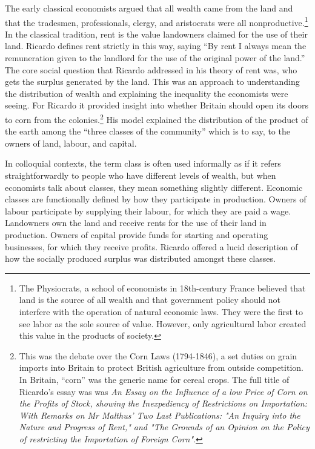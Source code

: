  The early classical economists argued that all wealth came from the land and that  the tradesmen, professionals, clergy, and aristocrats were all nonproductive.\footnote{The Physiocrats, a school of economists in 18th-century France believed that land is the source of all wealth  and that government policy should not interfere with the operation of natural economic laws. They were the first to see labor as the sole source of value. However,  only agricultural labor created this value in the products of society.} In the classical tradition, rent is the value landowners claimed for the use of their land. Ricardo defines rent strictly in this way, saying ``By rent I always mean the remuneration given to the landlord for the use of the original power of the land.''\cite{ricardoEssayInfluenceLow1815} The core social question that Ricardo addressed in his theory of rent was, who gets the surplus generated by the land. This was an approach to understanding the distribution of wealth and explaining the inequality the economists were seeing. For Ricardo it provided insight into whether Britain should open its doors to corn from the colonies.\footnote{This was the debate over the Corn Laws (1794-1846), a set duties on grain imports into Britain to protect British agriculture from outside competition. In Britain, ``corn'' was the generic name for cereal crops. The full title of Ricardo's essay was was \textit{An Essay on the Influence of a low Price of Corn on the Profits of Stock, showing the Inexpediency of Restrictions on Importation: With Remarks on Mr Malthus' Two Last Publications: "An Inquiry into the Nature and Progress of Rent," and "The Grounds of an Opinion on the Policy of restricting the Importation of Foreign Corn"}.}
His model  explained the distribution of the product of the earth among the “three classes of the community” which is to say, to the owners of land, labour, and capital. 

In colloquial contexts, the term \gls{class} is often used informally as if it refers straightforwardly to people who have different levels of wealth, but when economists talk about classes, they mean something slightly different. Economic classes are functionally defined  by how they participate in production. Owners of labour participate by supplying their labour, for which they are paid a wage. Landowners own the land and receive rents for the use of their land in production. Owners of capital provide funds for starting and operating businesses, for which they receive profits.  Ricardo offered a lucid description of  how the socially produced surplus was distributed amongst these classes. %

